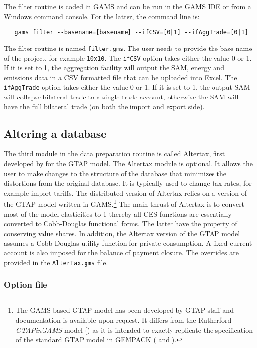 The filter routine is coded in GAMS and can be run in the GAMS IDE or from a
Windows command console. For the latter, the command line is:

\begin{verbatim}
   gams filter --basename=[basename] --ifCSV=[0|1] --ifAggTrade=[0|1]
\end{verbatim}

\noindent The filter routine is named \texttt{filter.gms}. The user needs to
provide the base name of the project, for example \texttt{10x10}. The
\texttt{ifCSV} option takes either the value 0 or 1. If it is set to 1, the
aggregation facility will output the SAM, energy and emissions data in a CSV
formatted file that can be uploaded into Excel. The \texttt{ifAggTrade} option
takes either the value 0 or 1. If it is set to 1, the output SAM will collapse
bilateral trade to a single trade account, otherwise the SAM will have the full
bilateral trade (on both the import and export side).

\subsection{Altering a database}

The third module in the data preparation routine is called Altertax, first
developed by \cite{MalcolmGTAPTP12} for the GTAP model. The Altertax module is
optional. It allows the user to make changes to the structure of the database
that minimizes the distortions from the original database. It is typically used
to change tax rates, for example import tariffs. The distributed version of
Altertax relies on a version of the GTAP model written in GAMS.\footnote{The
GAMS-based GTAP model has been developed by GTAP staff and documentation is
available upon request. It differs from the Rutherford \emph{GTAPinGAMS} model
(\cite{LanzRutherfordJGEA2016}) as it is intended to exactly replicate the
specification of the standard GTAP model in GEMPACK (\cite{CorongetalJGEA2017} and \cite{Hertel1997}).} The
main thrust of Altertax is to convert most of the model elasticities to 1
thereby all CES functions are essentially converted to Cobb-Douglas functional
forms. The latter have the property of conserving value shares. In addition, the
Altertax version of the GTAP model assumes a Cobb-Douglas utility function for
private consumption. A fixed current account is also imposed for the balance of
payment closure. The overrides are provided in the \texttt{AlterTax.gms} file.

\subsubsection{Option file}

